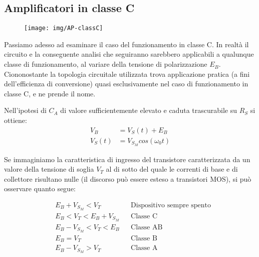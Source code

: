 \subsection{Amplificatori in classe C}

\begin{figure}[hbt]
\centering
\texttt{[image: img/AP-classC]}
\caption{}
\label{fig:ap-classc}
\end{figure}


Passiamo adesso ad esaminare il caso del funzionamento in classe C. In realtà il circuito e la conseguente analisi che seguiranno sarebbero applicabili a qualunque classe di funzionamento, al variare della tensione di polarizzazione $E_B$.\\
Ciononostante la topologia circuitale utilizzata trova applicazione pratica (a fini dell'efficienza di conversione) quasi esclusivamente nel caso di funzionamento in classe C, e ne prende il nome. 


Nell'ipotesi di $C_A$ di valore sufficientemente elevato e caduta trascurabile su $R_S$ si ottiene:
\[
\begin{aligned}
V_B &= V_S(t) + E_B\\
V_S(t) &= V_{S_M} cos ( \omega_0 t )
\end{aligned}
\]

Se immaginiamo la caratteristica di ingresso del transistore caratterizzata da un valore della
tensione di soglia $V_T$ al di sotto del quale le correnti di base e di collettore risultano nulle (il
discorso può essere esteso a transistori MOS), si può osservare quanto segue:

\[
\begin{aligned}
&E_B + V_{S_M } < V_T& & \mbox{Dispositivo sempre spento}\\
&E_B < V_T < E_B + V_{S_M }& & \mbox{Classe C}\\
&E_B - V_{S_M } < V_T < E_B & & \mbox{Classe AB}\\
&E_B = V_T& & \mbox{Classe B}\\
&E_B - V_{S_M} > V_T& & \mbox{Classe A}\\
\end{aligned}
\]

%

